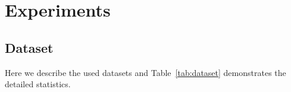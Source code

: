 \documentclass[letterpaper]{article} %
\begin{document}



\section{Experiments}

\subsection{Dataset}
Here we describe the used datasets and  Table~\ref{tab:dataset} demonstrates the detailed statistics.
\end{document}
